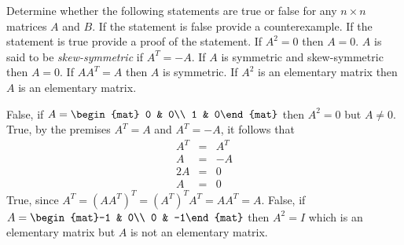 
\begin{Exercise}[
name={},
title={}, 
difficulty=0,
origin={\cite{BS}}]
Determine whether the following statements are true or false for any $n\times n$
matrices $A$ and $B$.  If the statement is false provide a counterexample. If the
statement is true provide a proof of the statement.
\Question If $A^2=0$ then $A=0$.
\Question $A$ is said to be \emph{skew-symmetric} if $A^T=-A$.  If $A$ is symmetric and skew-symmetric then $A=0$.
\Question If $AA^T=A$ then $A$ is symmetric.
\Question If $A^2$ is an elementary matrix then $A$ is an elementary matrix.
\end{Exercise}

\begin{Answer}
\Question False, if $A=\begin{mat} 0 & 0\\ 1 & 0\end{mat}$ then $A^2=0$ but $A\neq0$. 
\Question True, by the premises $A^T=A$ and $A^T=-A$, it follows that
\begin{eqnarray*}
A^T&=&A^T\\
A &=&-A\\
2A &=& 0\\
A & = &0
\end{eqnarray*}
\Question True, since $A^T=(AA^T)^T=(A^T)^TA^T=AA^T=A$.
\Question False, if $A=\begin{mat}-1 & 0\\ 0 & -1\end{mat}$ then $A^2=I$ which is an elementary matrix but $A$ is not an elementary matrix.
\end{Answer}
